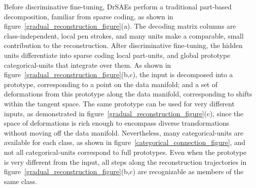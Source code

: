 \documentclass{article} %
\begin{document}
Before discriminative fine-tuning, DrSAEs perform a traditional part-based decomposition, familiar from sparse coding, as shown in figure~\ref{gradual_reconstruction_figure}(a).  The decoding matrix columns are class-independent, local pen strokes, and many units make a comparable, small contribution to the reconstruction.  After discriminative fine-tuning, the hidden units differentiate into sparse coding local part-units, and global prototype categorical-units that integrate %
over them.  As shown in figure~\ref{gradual_reconstruction_figure}(b,c), the input is decomposed into a prototype, corresponding to a point on the data manifold; and %
a set of deformations from this prototype along the data manifold, corresponding to shifts within the tangent space.  The same prototype can be used for very different inputs, as demonstrated in figure~\ref{gradual_reconstruction_figure}(c), since the space of deformations is rich enough to encompass diverse transformations without moving off the data manifold.  Nevertheless, many categorical-units are available for each class, as shown in figure~\ref{categorical_connection_figure}, and not all categorical-units correspond to full prototypes.  Even when the prototype is very different from the input, all steps along the reconstruction trajectories in figure~\ref{gradual_reconstruction_figure}(b,c) are recognizable as members of the same class.
\end{document}
